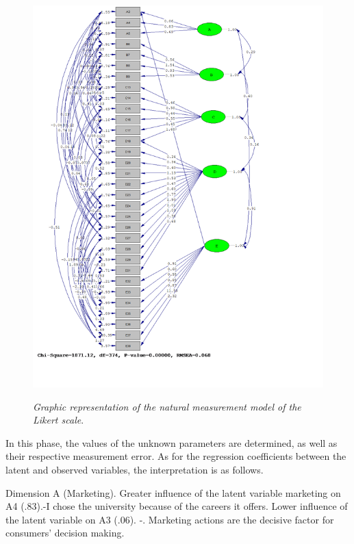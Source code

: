 \documentclass[english]{textolivre}
\begin{document}
\begin{figure}[h!]
\centering
\caption{\textit{Graphic representation of the natural measurement model of the Likert scale}.}
\begin{minipage}{1.0\textwidth}
\includegraphics[width=\textwidth]{Figure01.png}
\label{Figure01}
\end{minipage}
\end{figure}

In this phase, the values of the unknown parameters are determined, as well as their respective measurement error. As for the regression coefficients between the latent and observed variables, the interpretation is as follows.

Dimension A (Marketing). Greater influence of the latent variable marketing on A4 (.83).-I chose the university because of the careers it offers. Lower influence of the latent variable on A3 (.06). -. Marketing actions are the decisive factor for consumers' decision making.
\end{document}
